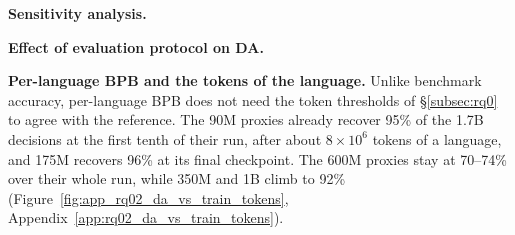 \textbf{Sensitivity analysis.}


\textbf{Effect of evaluation protocol on DA.}


\textbf{Per-language BPB and the tokens of the language.}
Unlike benchmark accuracy, per-language BPB does not need the token thresholds of \S\ref{subsec:rq0} to agree with the reference. The 90M proxies already recover 95\% of the 1.7B decisions at the first tenth of their run, after about $8\times10^{6}$ tokens of a language, and 175M recovers 96\% at its final checkpoint. The 600M proxies stay at 70--74\% over their whole run, while 350M and 1B climb to 92\% (Figure~\ref{fig:app_rq02_da_vs_train_tokens}, Appendix~\ref{app:rq02_da_vs_train_tokens}).



